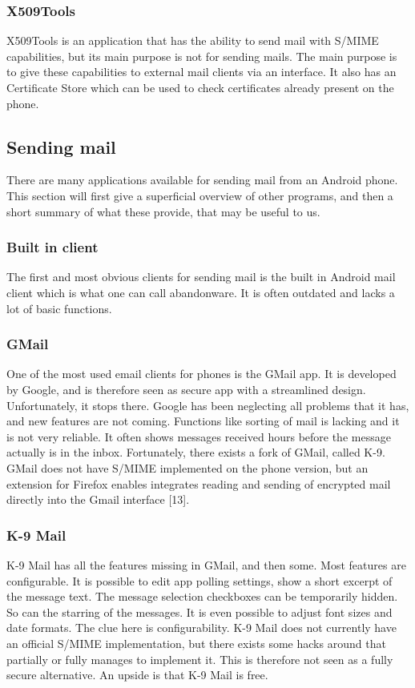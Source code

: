 \subsubsection{X509Tools}
X509Tools is an application that has the ability to send mail with S/MIME capabilities, but its main purpose is not for sending mails. The main purpose is to give these capabilities to external mail clients via an interface. It also has an Certificate Store which can be used to check certificates already present on the phone. 

\subsection{Sending mail}
There are many applications available for sending mail from an Android phone. This section will first give a superficial overview of other programs, and then a short summary of what these provide, that may be useful to us.

\subsubsection{Built in client}
The first and most obvious clients for sending mail is the built in Android mail client which is what one can call abandonware. It is often outdated and lacks a lot of basic functions.

\subsubsection{GMail}
One of the most used email clients for phones is the GMail app. It is developed by Google, and is therefore seen as secure app with a streamlined design. Unfortunately, it stops there. Google has been neglecting all problems that it has, and new features are not coming. Functions like sorting of mail is lacking and it is not very reliable. It often shows messages received hours before the message actually is in the inbox. Fortunately, there exists a fork of GMail, called K-9. GMail does not have S/MIME implemented on the phone version, but an extension for Firefox enables integrates reading and sending of encrypted mail directly into the Gmail interface [13].

\subsubsection{K-9 Mail}
K-9 Mail has all the features missing in GMail, and then some. Most features are configurable. It is possible to edit app polling settings, show a short excerpt of the message text. The message selection checkboxes can be temporarily hidden. So can the starring of the messages. It is even possible to adjust font sizes and date formats. The clue here is configurability. K-9 Mail does not currently have an official S/MIME implementation, but there exists some hacks around that partially or fully manages to implement it. This is therefore not seen as a fully secure alternative. An upside is that K-9 Mail is free.

